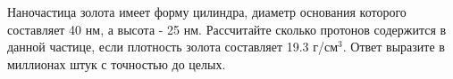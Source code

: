 
Наночастица
золота имеет форму цилиндра, диаметр основания которого составляет  40 нм, а высота - 25 нм. 
Рассчитайте сколько протонов содержится в данной частице, если плотность золота составляет 19.3 г/см$^3$.
 Ответ выразите в миллионах штук с точностью до целых.

